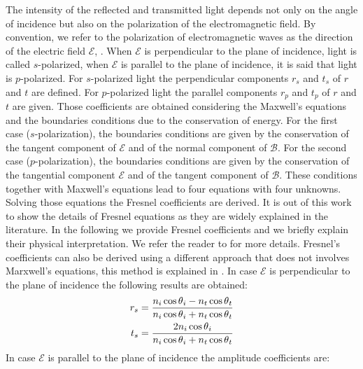 The intensity of the reflected and transmitted light depends not only on the angle of incidence but also on the polarization of the electromagnetic field.
By convention, we refer to the polarization of electromagnetic waves as the direction of the electric field $\boldsymbol{\mathcal{E}}$, 
\cite{feynman1964feynman}. When $\boldsymbol{\mathcal{E}}$ is perpendicular to the plane of incidence, light is called $s$-polarized, when
$\boldsymbol{\mathcal{E}}$ is parallel to the plane of incidence, it is said that light is $p$-polarized.
For $s$-polarized light the perpendicular components $r_s$ and $t_s$ of $r$ and $t$ are defined. 
For $p$-polarized light the parallel components $r_p$ and $t_p$ of $r$ and $t$ are given. 
Those coefficients are obtained considering the Maxwell's equations and the boundaries conditions due to the conservation of energy.
For the first case ($s$-polarization), the boundaries conditions are given by the conservation of the tangent component of $\boldsymbol{\mathcal{E}}$ and of the normal component of $\boldsymbol{\mathcal{B}}$. For the second case ($p$-polarization), the boundaries conditions are given by the conservation of the tangential component $\boldsymbol{\mathcal{E}}$ and of the tangent component of $\boldsymbol{\mathcal{B}}$. These conditions together with Maxwell's equations lead to four equations with four unknowns.
Solving those equations the Fresnel coefficients are derived. 
It is out of this work to show the details of Fresnel equations as they are widely explained in the literature. 
In the following we provide Fresnel coefficients and we briefly explain their physical interpretation. We refer the reader to \cite{born2013principles, hecht1998hecht} for more details. 
Fresnel's coefficients can also be derived using a different approach that does not involves Marxwell's equations, this method is explained in \cite{feynman2011feynman}. 
In case $\boldsymbol{\mathcal{E}}$ is perpendicular to the plane of incidence the following results are obtained:
\begin{equation} \label{Fresnel_perpendicular}
\begin{split}
r_{s} & = \frac{n_i\cos\mbox{$\theta$}_i-n_t \cos\mbox{$\theta$}_t}{n_i \cos\mbox{$\theta$}_i+n_t\cos\mbox{$\theta$}_t}\\
t_{s} & =  \frac{2n_i\cos\mbox{$\theta$}_i}{n_i\cos\mbox{$\theta$}_i+n_t\cos\mbox{$\theta$}_t}
\end{split}
\end{equation}
In case $\boldsymbol{\mathcal{E}}$ is parallel to the plane of incidence the amplitude coefficients are:
